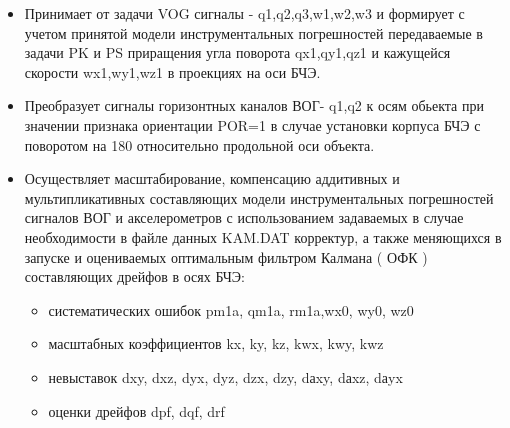 \begin{itemize}
\item Принимает от задачи VOG сигналы - q1,q2,q3,w1,w2,w3 и формирует с учетом принятой модели  инструментальных погрешностей передаваемые в задачи PK и PS  
приращения угла поворота qx1,qy1,qz1 и кажущейся скорости wx1,wy1,wz1 в проекциях на оси БЧЭ.
\item Преобразует сигналы горизонтных каналов ВОГ- q1,q2  к осям обьекта при значении признака ориентации POR=1 в случае установки корпуса БЧЭ 
с поворотом на 180 относительно продольной оси объекта.
\item Осуществляет масштабирование, компенсацию аддитивных и мультипликативных составляющих модели  инструментальных погрешностей   
сигналов ВОГ и акселерометров с использованием задаваемых в случае необходимости в файле данных KAM.DAT корректур, а также меняющихся в запуске 
и  оцениваемых оптимальным фильтром Калмана ( ОФК ) составляющих дрейфов в осях БЧЭ:  
    \begin{itemize}
\item систематических ошибок  pm1a, qm1a, rm1a,wx0, wy0, wz0
\item масштабных коэффициентов kx, ky, kz,  kwx, kwy, kwz
\item невыставок  dxy, dxz, dyx, dyz, dzx, dzy, dаxy, dаxz, dаyx
\item оценки дрейфов dpf, dqf, drf
    \end{itemize}
\end{itemize}
